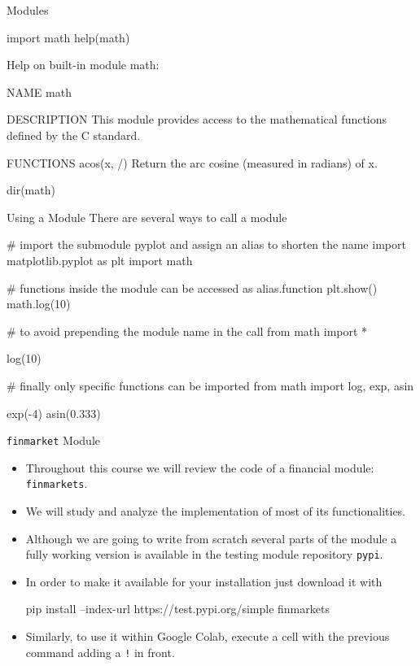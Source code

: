 \documentclass{beamer}
\begin{document}
\begin{frame}[fragile]{Modules}
\begin{ipython}
import math
help(math)
\end{ipython}
\begin{ioutput}
Help on built-in module math:

NAME
    math

DESCRIPTION
    This module provides access to the mathematical functions
    defined by the C standard.

FUNCTIONS
    acos(x, /)
        Return the arc cosine (measured in radians) of x.
\end{ioutput}
\begin{ipython}
dir(math)
\end{ipython}
\begin{ioutput}
['__doc__', '__loader__', '__name__', '__package__', '__spec__', 'acos',
 'acosh', 'asin', 'asinh', 'atan', 'atan2', 'atanh', ...
\end{ioutput}    
\end{frame}

\begin{frame}[fragile]{Using a Module}
  There are several ways to call a module
  \begin{ipython}
# import the submodule pyplot and assign an alias to shorten the name    
import matplotlib.pyplot as plt
import math

# functions inside the module can be accessed as alias.function
plt.show()
math.log(10)

# to avoid prepending the module name in the call
from math import *

log(10)

# finally only specific functions can be imported
from math import log, exp, asin

exp(-4)
asin(0.333)
\end{ipython}
\end{frame}

\begin{frame}[fragile]{\texttt{finmarket} Module}
  \begin{itemize}
  \item Throughout this course we will review the code of a financial module: \texttt{finmarkets}.
  \item We will study and analyze the implementation of most of its functionalities.
  \item Although we are going to write from scratch several parts of the module a fully working version is available in the testing module repository \texttt{pypi}.
  \item In order to make it available for your installation just download it with
\begin{ipython}
pip install --index-url https://test.pypi.org/simple finmarkets
\end{ipython}
  \item Similarly, to use it within Google Colab, execute a cell with the previous command adding a \texttt{!} in front.
  \end{itemize}
\end{frame}
\end{document}
